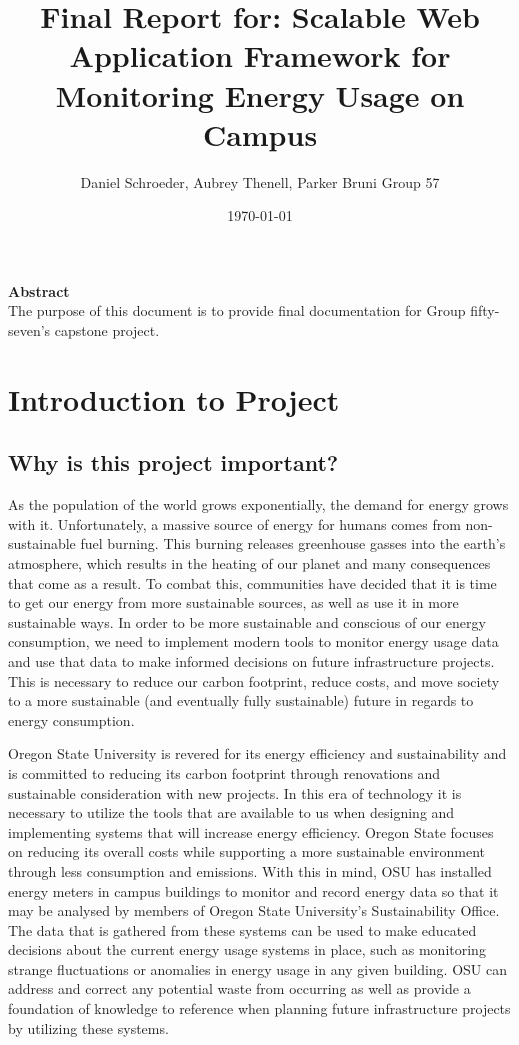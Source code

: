 \documentclass[journal,10pt,onecolumn,compsoc]{IEEEtran}
\title{Final Report for: \linebreak Scalable Web Application Framework for Monitoring Energy Usage on Campus}
\author{Daniel Schroeder, Aubrey Thenell, Parker Bruni \linebreak Group 57}
\date{\today}
\begin{document}
    \maketitle
    \vspace{2cm}
    \begin{center}
    \noindent \textbf{Abstract} \\
                \indent The purpose of this document is to provide final documentation for Group fifty-seven's capstone project. 
    \end{center}         
    
    \newpage
    \tableofcontents
        
    \section{Introduction to Project}  
    \subsection{Why is this project important?}
    \indent As the population of the world grows exponentially, the demand for energy grows with it. Unfortunately, a massive source of energy for humans comes from non-sustainable fuel burning. This burning releases greenhouse gasses into the earth’s atmosphere, which results in the heating of our planet and many consequences that come as a result. To combat this, communities have decided that it is time to get our energy from more sustainable sources, as well as use it in more sustainable ways. In order to be more sustainable and conscious of our energy consumption, we need to implement modern tools to monitor energy usage data and use that data to make informed decisions on future infrastructure projects. This is necessary to reduce our carbon footprint, reduce costs, and move society to a more sustainable (and eventually fully sustainable) future in regards to energy consumption.

    \indent Oregon State University is revered for its energy efficiency and sustainability and is committed to reducing its carbon footprint through renovations and sustainable consideration with new projects. In this era of technology it is necessary to utilize the tools that are available to us when designing and implementing systems that will increase energy efficiency. Oregon State focuses on reducing its overall costs while supporting a more sustainable environment through less consumption and emissions. With this in mind, OSU has installed energy meters in campus buildings to monitor and record energy data so that it may be analysed by members of Oregon State University’s Sustainability Office. The data that is gathered from these systems can be used to make educated decisions about the current energy usage systems in place, such as monitoring strange fluctuations or anomalies in energy usage in any given building. OSU can address and correct any potential waste from occurring as well as provide a foundation of knowledge to reference when planning future infrastructure projects by utilizing these systems.
\end{document}
